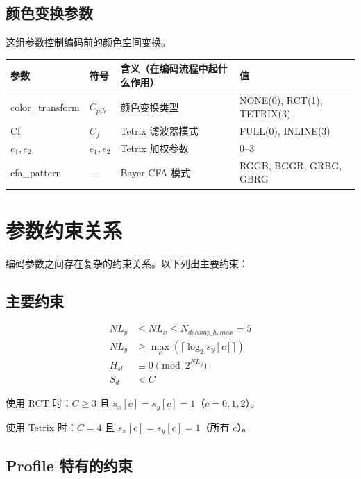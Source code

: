 \subsection{颜色变换参数}

这组参数控制编码前的颜色空间变换。

\begin{table}[H]
\centering
\begin{tabular}{@{}llp{5.5cm}l@{}}
\toprule
参数 & 符号 & 含义（在编码流程中起什么作用） & 值 \\
\midrule
color\_transform & $C_{pih}$ & 颜色变换类型 & NONE(0), RCT(1), TETRIX(3) \\
Cf & $C_f$ & Tetrix 滤波器模式 & FULL(0), INLINE(3) \\
$e_1, e_2$ & $e_1, e_2$ & Tetrix 加权参数 & 0--3 \\
cfa\_pattern & --- & Bayer CFA 模式 & RGGB, BGGR, GRBG, GBRG \\
\bottomrule
\end{tabular}
\end{table}

\section{参数约束关系}

编码参数之间存在复杂的约束关系。以下列出主要约束：

\subsection{主要约束}

\begin{align}
NL_y &\leq NL_x \leq N_{decomp\_h,max} = 5 \label{eq:nl-constraint}\\
NL_y &\geq \max_c(\lceil \log_2 s_y[c] \rceil) \label{eq:nly-bound}\\
H_{sl} &\equiv 0 \pmod{2^{NL_y}} \label{eq:hsl-mod}\\
S_d &< C \label{eq:sd-constraint}
\end{align}

使用 RCT 时：$C \geq 3$ 且 $s_x[c] = s_y[c] = 1$（$c = 0, 1, 2$）。

使用 Tetrix 时：$C = 4$ 且 $s_x[c] = s_y[c] = 1$（所有 $c$）。

\subsection{Profile 特有的约束}

